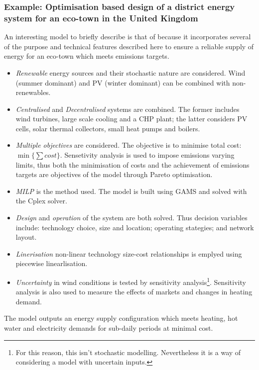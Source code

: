 \subsubsection{Example: Optimisation based design of a district energy system for an eco-town in the United Kingdom \citep{Weber2011}}
An interesting model to briefly describe is that of \citet{Weber2011} because it incorporates several of the purpose and technical features described here to ensure a reliable supply of energy for an eco-town which meets emissions targets.
\begin{itemize}
	\item \emph{Renewable} energy sources and their stochastic nature are considered. Wind (summer dominant) and PV (winter dominant) can be combined with non-renewables.
	\item \emph{Centralised} and \emph{Decentralised} systems are combined. The former includes wind turbines, large scale cooling and a CHP plant; the latter considers PV cells, solar thermal  collectors, small heat pumps and boilers.
	\item \emph{Multiple objectives} are considered. The objective is to minimise total cost:  $\min\{\sum cost\}$. Sensetivity analysis is used to impose emissions varying limits, thus both the minimisation of costs and the achievement of emissions targets are objectives of the model through Pareto optimisation.
	\item \emph{MILP} is the method used. The model is built using GAMS and solved with the Cplex solver.
	\item \emph{Design} and \emph{operation} of the system are both solved. Thus decision variables include: technology choice, size and location; operating stategies; and network layout.
	\item \emph{Linerisation} non-linear technology size-cost relationships is emplyed using piecewise linearlisation.
	\item \emph{Uncertainty} in wind conditions is tested by sensitivity analysis\footnote{For this reason, this isn't stochastic modelling. Nevertheless it is a way of considering a model with uncertain inputs.}. Sensitivity analysis is also used to measure the effects of markets and changes in heating demand.
\end{itemize}
The model outputs an energy supply configuration which meets heating, hot water and electricity demands for sub-daily periods at minimal cost.

